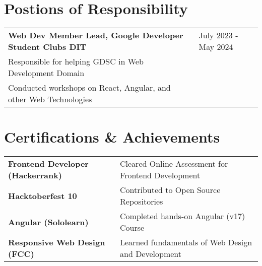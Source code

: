 \documentclass[a4paper,10pt]{article}
\begin{document}
\section{Postions of Responsibility}

\begin{tabularx}{\linewidth}{@{}l X@{}}	

\textbf{Web Dev Member Lead, Google Developer Student Clubs DIT} & \hfill 
July 2023 - May 2024  \\ \vspace*{1mm}

Responsible for helping GDSC in Web Development Domain \\ 
Conducted workshops on React, Angular, and other Web Technologies \\

\end{tabularx}

\section{Certifications \& Achievements}




\begin{tabularx}{\linewidth}{@{}l X@{}}
\textbf{Frontend Developer (Hackerrank)} &  \normalsize{Cleared Online Assessment for Frontend Development}\\
\textbf{Hacktoberfest 10}  &  \normalsize{Contributed to Open Source Repositories }\\
\textbf{Angular (Sololearn)} &  \normalsize{Completed hands-on Angular (v17) Course}\\
\textbf{Responsive Web Design (FCC)}  &  \normalsize{Learned fundamentals of Web Design and Development}\\
\end{tabularx}

\end{document}
